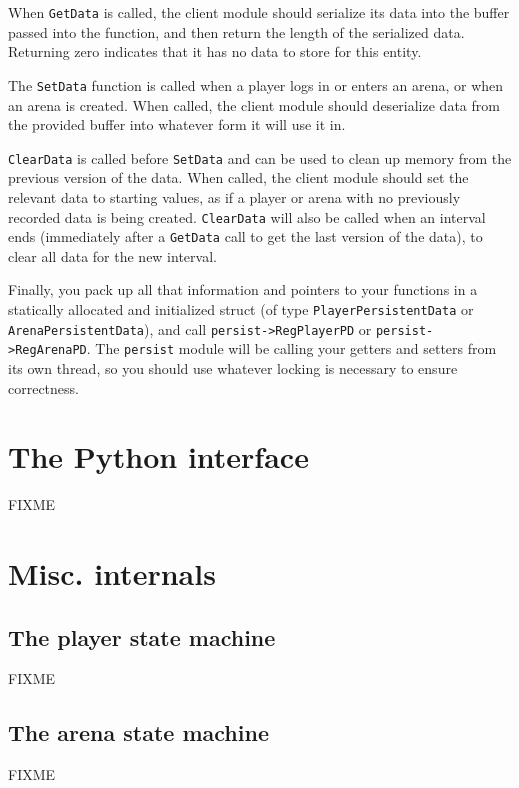 \documentclass{article}
\begin{document}
When \verb/GetData/ is called, the client module should serialize its
data into the buffer passed into the function, and then return the
length of the serialized data. Returning zero indicates that it has no
data to store for this entity.

The \verb/SetData/ function is called when a player logs in or enters an
arena, or when an arena is created. When called, the client module
should deserialize data from the provided buffer into whatever form it
will use it in.

\verb/ClearData/ is called before \verb/SetData/ and can be used to
clean up memory from the previous version of the data. When called, the
client module should set the relevant data to starting values, as if a
player or arena with no previously recorded data is being created.
\verb/ClearData/ will also be called when an interval ends (immediately
after a \verb/GetData/ call to get the last version of the data), to
clear all data for the new interval.


Finally, you pack up all that information and pointers to your functions
in a statically allocated and initialized struct (of type
\verb/PlayerPersistentData/ or \verb/ArenaPersistentData/), and call
\verb/persist->RegPlayerPD/ or \verb/persist->RegArenaPD/. The
\verb/persist/ module will be calling your getters and setters from its
own thread, so you should use whatever locking is necessary to ensure
correctness.


\section{The Python interface}

FIXME


\section{Misc. internals}

\subsection{The player state machine}

FIXME

\subsection{The arena state machine}

FIXME
\end{document}
